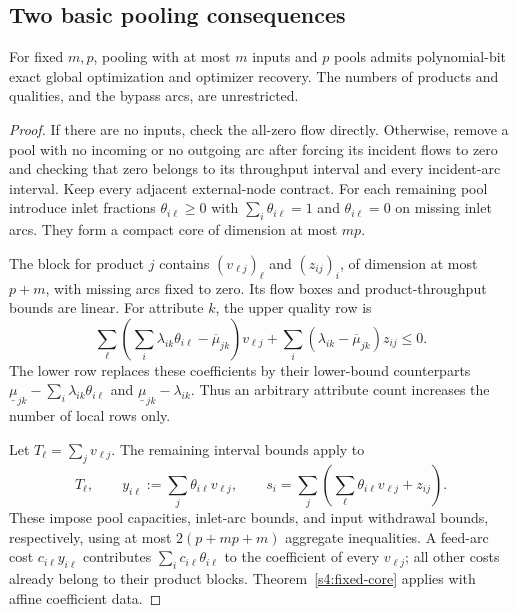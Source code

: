 \subsection{Two basic pooling consequences}\label{s4:pooling-basic}

\begin{corollary}\label{s4:fixed-inputs}
For fixed $m,p$, pooling with at most $m$ inputs and $p$ pools admits
polynomial-bit exact global optimization and optimizer recovery.
The numbers of products and qualities, and the bypass arcs, are
unrestricted.
\end{corollary}
\begin{proof}
If there are no inputs, check the all-zero flow directly. Otherwise,
remove a pool with no incoming or no outgoing arc after forcing its
incident flows to zero and checking that zero belongs to its throughput
interval and every incident-arc interval.
Keep every adjacent external-node contract. For each remaining pool
introduce inlet fractions $\theta_{i\ell}\ge0$ with
$\sum_i\theta_{i\ell}=1$ and $\theta_{i\ell}=0$ on missing inlet arcs.
They form a compact core of dimension at most $mp$.

The block for product $j$ contains $(v_{\ell j})_\ell$ and
$(z_{ij})_i$, of dimension at most $p+m$, with missing arcs fixed to
zero. Its flow boxes and product-throughput bounds are linear. For
attribute $k$, the upper quality row is
\begin{equation}
 \sum_\ell\left(\sum_i\lambda_{ik}\theta_{i\ell}
                    -\overline\mu_{jk}\right)v_{\ell j}
 +\sum_i(\lambda_{ik}-\overline\mu_{jk})z_{ij}\le0.
 \label{s4:fraction-product}
\end{equation}
The lower row replaces these coefficients by their lower-bound
counterparts $\underline\mu_{jk}-\sum_i\lambda_{ik}\theta_{i\ell}$
and $\underline\mu_{jk}-\lambda_{ik}$. Thus an arbitrary attribute
count increases the number of local rows only.

Let $T_\ell=\sum_jv_{\ell j}$. The remaining interval bounds apply to
\begin{equation}
 T_\ell,\qquad
 y_{i\ell}:=\sum_j\theta_{i\ell}v_{\ell j},\qquad
 s_i=\sum_j\left(\sum_\ell\theta_{i\ell}v_{\ell j}+z_{ij}\right).
 \label{s4:fraction-aggregates}
\end{equation}
These impose pool capacities, inlet-arc bounds, and input withdrawal
bounds, respectively, using at most $2(p+mp+m)$ aggregate inequalities.
A feed-arc cost $c_{i\ell}y_{i\ell}$ contributes
$\sum_i c_{i\ell}\theta_{i\ell}$ to the coefficient of every
$v_{\ell j}$; all other costs already belong to their product blocks.
Theorem~\ref{s4:fixed-core} applies with affine coefficient data.


\end{proof}
